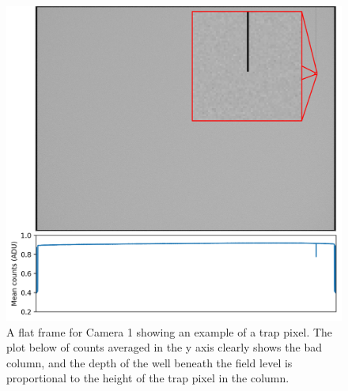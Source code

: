 \begin{colsection}
\begin{colsection}
\begin{figure}[p]
    \begin{center}
        \includegraphics[width=\textwidth]{images/detectors/defect_plot.pdf}
    \end{center}
    \caption[An example of a trap pixel]{
        A flat frame for Camera 1 showing an example of a trap pixel. The plot below of counts averaged in the y axis clearly shows the bad column, and the depth of the well beneath the field level is proportional to the height of the trap pixel in the column.
    }\label{fig:itsatrap}
\end{figure}

\clearpage

\end{colsection}


\end{colsection}


\newpage
